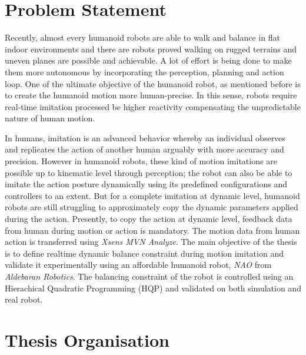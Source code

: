 \section{Problem Statement}

Recently, almost every humanoid robots are able to walk and balance in flat indoor environments and there are robots 
proved walking on rugged terrains and uneven planes are possible and achievable. A lot of effort is being done to make
them more autonomous by incorporating the perception, planning and action loop. One of the ultimate objective of the 
humanoid robot, as mentioned before is to create the humanoid motion more human-precise. In this sense, robots require 
real-time imitation processed be higher reactivity compensating the unpredictable nature of human motion.

 

In humans, imitation is an advanced behavior whereby an individual observes and replicates the action of another 
human arguably with more accuracy and precision. However in humanoid robots, these kind of motion imitations are possible
up to kinematic level through perception; the robot can also be able to imitate the action posture dynamically using its predefined 
configurations and controllers to an extent. But for a complete imitation at dynamic level, humanoid robots are still struggling to 
approximately copy the dynamic parameters applied during the action. Presently, to copy the action at dynamic level, 
feedback data from human during motion or action is mandatory. The motion data from human action is transferred using 
\textit{Xsens MVN Analyze}. The main objective of the thesis is to define realtime dynamic balance constraint during
motion imitation and validate it experimentally using an affordable humanoid robot, \textit{NAO} from \textit{Aldebaran
Robotics}. The balancing constraint of the robot is controlled using an Hierachical Quadratic Programming (HQP) and validated on both 
simulation and real robot.

\section{Thesis Organisation}
